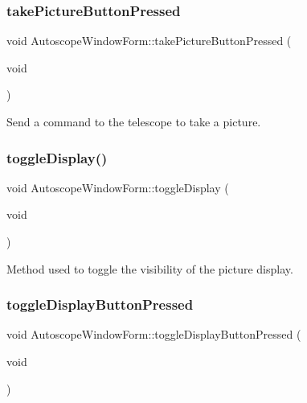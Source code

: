 \subsubsection{\texorpdfstring{takePictureButtonPressed}{takePictureButtonPressed}}
{\footnotesize\ttfamily void Autoscope\+Window\+Form\+::take\+Picture\+Button\+Pressed (\begin{DoxyParamCaption}\item[{void}]{ }\end{DoxyParamCaption})\hspace{0.3cm}{\ttfamily [slot]}}



Send a command to the telescope to take a picture. 

\mbox{\label{class_autoscope_window_form_adfa249163e1c2a72485c24a575a67efb}} 
\subsubsection{\texorpdfstring{toggleDisplay()}{toggleDisplay()}}
{\footnotesize\ttfamily void Autoscope\+Window\+Form\+::toggle\+Display (\begin{DoxyParamCaption}\item[{void}]{ }\end{DoxyParamCaption})}



Method used to toggle the visibility of the picture display. 

\mbox{\label{class_autoscope_window_form_ae7caa21b226f06d2f32fd6da6d539bbf}} 
\subsubsection{\texorpdfstring{toggleDisplayButtonPressed}{toggleDisplayButtonPressed}}
{\footnotesize\ttfamily void Autoscope\+Window\+Form\+::toggle\+Display\+Button\+Pressed (\begin{DoxyParamCaption}\item[{void}]{ }\end{DoxyParamCaption})\hspace{0.3cm}{\ttfamily [slot]}}



